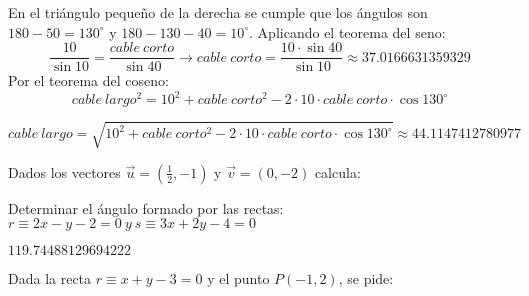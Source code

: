 \documentclass[spanish, 11pt]{exam}
\begin{document}
\begin{questions}
\begin{solution}
    En el triángulo pequeño de la derecha se cumple que los ángulos son $180-50=130^\circ$ y $180-130-40=10^\circ$. Aplicando el teorema del seno:
    $$\dfrac{10}{\sin{10}}=\dfrac{cable\ corto}{\sin{40}} \to cable\ corto=\dfrac{10\cdot\sin{40}}{\sin{10}}\approx 37.0166631359329
    $$
    Por el teorema del coseno:
    $$cable\ largo^2=10^2 + cable\ corto^2 - 2\cdot 10\cdot cable \ corto \cdot \cos{130^\circ}$$
    
    $$cable \ largo =\sqrt{10^2 + cable\ corto^2 - 2\cdot 10\cdot cable \ corto \cdot \cos{130^\circ}}\approx 44.1147412780977$$

\end{solution}

\addpoints

\question Dados los vectores $\vec{u}=(\frac{1}{2},-1)$ y $\vec{v}=(0,-2)$ calcula:


\question[1] Determinar el ángulo formado por las rectas: $ r\equiv2x-y-2=0\  y \ s\equiv3x+2y-4=0 $  \begin{solution}  $ 119.74488129694222 $  \end{solution}

\question Dada la recta $r\equiv x+y-3=0$ y el punto $P(-1,2)$, se pide:
\end{questions}
\end{document}
